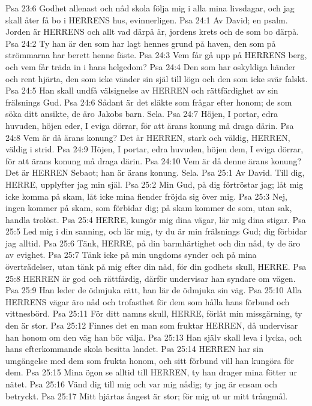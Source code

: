 Psa 23:6  Godhet allenast och nåd skola följa mig i alla mina livsdagar, och jag skall åter få bo i HERRENS hus, evinnerligen.
Psa 24:1  Av David; en psalm. Jorden är HERRENS och allt vad därpå är, jordens krets och de som bo därpå.
Psa 24:2  Ty han är den som har lagt hennes grund på haven, den som på strömmarna har berett henne fäste.
Psa 24:3  Vem får gå upp på HERRENS berg, och vem får träda in i hans helgedom?
Psa 24:4  Den som har oskyldiga händer och rent hjärta, den som icke vänder sin själ till lögn och den som icke svär falskt.
Psa 24:5  Han skall undfå välsignelse av HERREN och rättfärdighet av sin frälsnings Gud.
Psa 24:6  Sådant är det släkte som frågar efter honom; de som söka ditt ansikte, de äro Jakobs barn. Sela.
Psa 24:7  Höjen, I portar, edra huvuden, höjen eder, I eviga dörrar, för att ärans konung må draga därin.
Psa 24:8  Vem är då ärans konung? Det är HERREN, stark och väldig, HERREN, väldig i strid.
Psa 24:9  Höjen, I portar, edra huvuden, höjen dem, I eviga dörrar, för att ärans konung må draga därin.
Psa 24:10  Vem är då denne ärans konung? Det är HERREN Sebaot; han är ärans konung. Sela.
Psa 25:1  Av David. Till dig, HERRE, upplyfter jag min själ.
Psa 25:2  Min Gud, på dig förtröstar jag; låt mig icke komma på skam, låt icke mina fiender fröjda sig över mig.
Psa 25:3  Nej, ingen kommer på skam, som förbidar dig; på skam kommer de som, utan sak, handla trolöst.
Psa 25:4  HERRE, kungör mig dina vägar, lär mig dina stigar.
Psa 25:5  Led mig i din sanning, och lär mig, ty du är min frälsnings Gud; dig förbidar jag alltid.
Psa 25:6  Tänk, HERRE, på din barmhärtighet och din nåd, ty de äro av evighet.
Psa 25:7  Tänk icke på min ungdoms synder och på mina överträdelser, utan tänk på mig efter din nåd, för din godhets skull, HERRE.
Psa 25:8  HERREN är god och rättfärdig, därför undervisar han syndare om vägen.
Psa 25:9  Han leder de ödmjuka rätt, han lär de ödmjuka sin väg.
Psa 25:10  Alla HERRENS vägar äro nåd och trofasthet för dem som hålla hans förbund och vittnesbörd.
Psa 25:11  För ditt namns skull, HERRE, förlåt min missgärning, ty den är stor.
Psa 25:12  Finnes det en man som fruktar HERREN, då undervisar han honom om den väg han bör välja.
Psa 25:13  Han själv skall leva i lycka, och hans efterkommande skola besitta landet.
Psa 25:14  HERREN har sin umgängelse med dem som frukta honom, och sitt förbund vill han kungöra för dem.
Psa 25:15  Mina ögon se alltid till HERREN, ty han drager mina fötter ur nätet.
Psa 25:16  Vänd dig till mig och var mig nådig; ty jag är ensam och betryckt.
Psa 25:17  Mitt hjärtas ångest är stor; för mig ut ur mitt trångmål.
